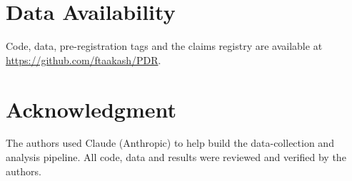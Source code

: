 \documentclass[conference]{IEEEtran}
\begin{document}
\section*{Data Availability}
Code, data, pre-registration tags and the claims registry are available at
\url{https://github.com/ftaakash/PDR}.

\section*{Acknowledgment}
The authors used Claude (Anthropic) to help build the data-collection and
analysis pipeline. All code, data and results were reviewed and verified by
the authors.



\end{document}
